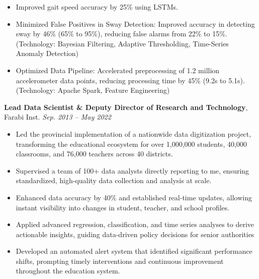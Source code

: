 \documentclass[a4paper,10pt]{article}
\begin{document}
\begin{itemize}

    \item Improved gait speed accuracy by 25\% using LSTMs.
    
    \item Minimized False Positives in Sway Detection: Improved accuracy in detecting sway by 46\% (65\% to 95\%), reducing false alarms from 22\% to 15\%. (Technology: Bayesian Filtering, Adaptive Thresholding, Time-Series Anomaly Detection)
    
    \item Optimized Data Pipeline: Accelerated preprocessing of 1.2 million accelerometer data points, reducing processing time by 45\% (9.2s to 5.1s). (Technology: Apache Spark, Feature Engineering)

\end{itemize}

\vspace{6pt}
\hspace{3mm} {\bfseries Lead Data Scientist \& Deputy Director of Research and Technology}, Farabi Inst. \hfill \textit{Sep. 2013 -- May 2022}

\begin{itemize}
    
    \item Led the provincial implementation of a nationwide data digitization project, transforming the educational ecosystem for over 1,000,000 students, 40,000 classrooms, and 76,000 teachers across 40 districts.
   
    \item Supervised a team of 100+ data analysts directly reporting to me, ensuring standardized, high-quality data collection and analysis at scale.
    
    \item Enhanced data accuracy by 40\% and established real-time updates, allowing instant visibility into changes in student, teacher, and school profiles.
    
    \item Applied advanced regression, classification, and time series analyses to derive actionable insights, guiding data-driven policy decisions for senior authorities
    
    \item Developed an automated alert system that identified significant performance shifts, prompting timely interventions and continuous improvement throughout the education system.
    
\end{itemize}
\end{document}
